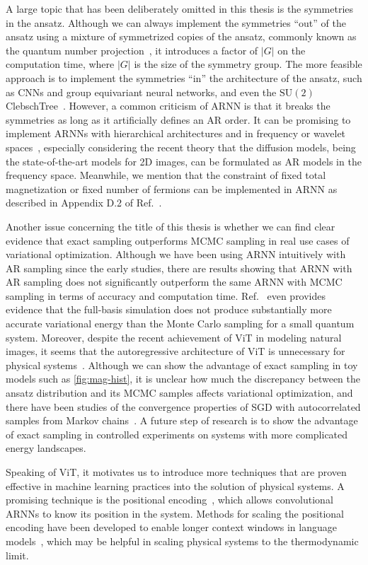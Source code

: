 A large topic that has been deliberately omitted in this thesis is the symmetries in the ansatz. Although we can always implement the symmetries ``out'' of the ansatz using a mixture of symmetrized copies of the ansatz, commonly known as the quantum number projection~\cite{tahara2008variational}, it introduces a factor of $|G|$ on the computation time, where $|G|$ is the size of the symmetry group. The more feasible approach is to implement the symmetries ``in'' the architecture of the ansatz, such as CNNs and group equivariant neural networks, and even the $\mathrm{SU}(2)$ ClebschTree~\cite{vieijra2021many}. However, a common criticism of ARNN is that it breaks the symmetries as long as it artificially defines an AR order. It can be promising to implement ARNNs with hierarchical architectures and in frequency or wavelet spaces~\cite{nash2021generating, bialas2022hierarchical, hoogeboom2022autoregressive, mattar2024wavelets}, especially considering the recent theory that the diffusion models, being the state-of-the-art models for 2D images, can be formulated as AR models in the frequency space. Meanwhile, we mention that the constraint of fixed total magnetization or fixed number of fermions can be implemented in ARNN as described in Appendix D.2 of Ref.~\cite{hibat2020recurrent}.

Another issue concerning the title of this thesis is whether we can find clear evidence that exact sampling outperforms MCMC sampling in real use cases of variational optimization. Although we have been using ARNN intuitively with AR sampling since the early studies, there are results showing that ARNN with AR sampling does not significantly outperform the same ARNN with MCMC sampling in terms of accuracy and computation time. Ref.~\cite{bukov2021learning} even provides evidence that the full-basis simulation does not produce substantially more accurate variational energy than the Monte Carlo sampling for a small quantum system. Moreover, despite the recent achievement of ViT in modeling natural images, it seems that the autoregressive architecture of ViT is unnecessary for physical systems~\cite{viteritti2023transformer, rende2024queries}. Although we can show the advantage of exact sampling in toy models such as \cref{fig:mag-hist}, it is unclear how much the discrepancy between the ansatz distribution and its MCMC samples affects variational optimization, and there have been studies of the convergence properties of SGD with autocorrelated samples from Markov chains~\cite{sun2018markov}. A future step of research is to show the advantage of exact sampling in controlled experiments on systems with more complicated energy landscapes.

Speaking of ViT, it motivates us to introduce more techniques that are proven effective in machine learning practices into the solution of physical systems. A promising technique is the positional encoding~\cite{ke2021rethinking}, which allows convolutional ARNNs to know its position in the system. Methods for scaling the positional encoding have been developed to enable longer context windows in language models~\cite{liu2024scaling, peng2024yarn}, which may be helpful in scaling physical systems to the thermodynamic limit.
